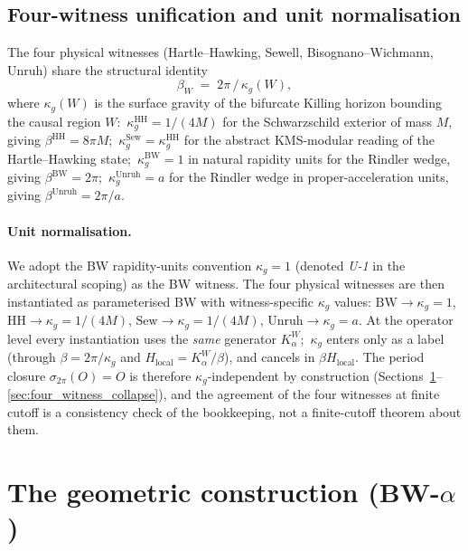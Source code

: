 \documentclass[11pt,a4paper]{article}
\theoremstyle{plain}
\theoremstyle{definition}
\newcommand{\BW}{\mathrm{BW}}
\newcommand{\HH}{\mathrm{HH}}
\newcommand{\Sew}{\mathrm{Sew}}
\newcommand{\Unruh}{\mathrm{Unruh}}
\begin{document}
\subsection{Four-witness unification and unit normalisation}
\label{sec:four_witness_unit}

The four physical witnesses (Hartle--Hawking, Sewell,
Bisognano--Wichmann, Unruh) share the structural identity
\begin{equation}\label{eq:beta_kappa_g}
   \beta_W \;=\; 2\pi \,/\, \kappa_g(W),
\end{equation}
where $\kappa_g(W)$ is the surface gravity of the bifurcate Killing
horizon bounding the causal region $W$:\
$\kappa_g^{\HH} = 1/(4M)$ for the Schwarzschild exterior of mass $M$,
giving $\beta^{\HH} = 8\pi M$;\
$\kappa_g^{\Sew} = \kappa_g^{\HH}$ for the abstract KMS-modular
reading of the Hartle--Hawking state;\
$\kappa_g^{\BW} = 1$ in natural rapidity units for the Rindler wedge,
giving $\beta^{\BW} = 2\pi$;\
$\kappa_g^{\Unruh} = a$ for the Rindler wedge in proper-acceleration
units, giving $\beta^{\Unruh} = 2\pi / a$.

\paragraph{Unit normalisation.}
We adopt the BW rapidity-units convention $\kappa_g = 1$ (denoted
\emph{U-1} in the architectural scoping) as the BW witness.
The four physical witnesses are then instantiated as parameterised
BW with witness-specific $\kappa_g$ values: $\BW \to \kappa_g = 1$,
$\HH \to \kappa_g = 1/(4M)$, $\Sew \to \kappa_g = 1/(4M)$,
$\Unruh \to \kappa_g = a$. At the operator level every instantiation
uses the \emph{same} generator $K_\alpha^W$;\ $\kappa_g$ enters only as
a label (through $\beta = 2\pi/\kappa_g$ and $H_{\mathrm{local}} =
K_\alpha^W/\beta$), and cancels in $\beta H_{\mathrm{local}}$.  The
period closure $\sigma_{2\pi}(O) = O$ is therefore
$\kappa_g$-independent by construction
(Sections~\ref{sec:geometric_construction}--\ref{sec:four_witness_collapse}),
and the agreement of the four witnesses at finite cutoff is a
consistency check of the bookkeeping, not a finite-cutoff theorem about
them.

\section{The geometric construction (BW-$\alpha$)}
\label{sec:geometric_construction}
\end{document}
